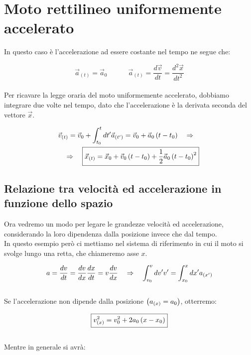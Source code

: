 \section{Moto rettilineo uniformemente accelerato}
In questo caso è l'accelerazione ad essere costante nel tempo
ne segue che:

\begin{equation}
    \vec a_{(t)} = \vec a_0 \quad\quad\quad \vec a_{(t)} = \frac{d\vec v}{dt} = 
    \frac{d^2\vec x}{dt^2}
\label{eq:acceleration}
\end{equation}
\\
Per ricavare la legge oraria del moto uniformemente accelerato,
dobbiamo integrare due volte nel tempo, dato che l'accelerazione
è la derivata seconda del vettore $\vec x$.

\begin{multline}
    \vec v_{(t)} = \vec v_0 + \int_{t_0}^{t}dt' \vec a_{(t')} =  \vec v_0 +  \vec a_0\left( t - t_0\right)\quad\Rightarrow\quad
    \\\quad\Rightarrow\quad\boxed{\vec x_{(t)} = \vec x_0 +\vec v_0\left( t - t_0\right) + \frac12\vec a_0\left( t-t_0\right)^2}
\label{eq:MRUA}
\end{multline}

\subsection{Relazione tra velocità ed accelerazione in funzione dello spazio}
Ora vedremo un modo per legare le grandezze velocità ed 
accelerazione, considerando la loro dipendenza dalla posizione
invece che dal tempo.\\
In questo esempio però ci mettiamo nel sistema di riferimento 
in cui il moto si svolge lungo una retta, che chiameremo asse $x$.

\begin{equation}
    a = \frac{dv}{dt} = \frac{dv}{dx}\frac{dx}{dt} =
    v\frac{dv}{dx}\quad\Rightarrow\quad \int_{v_0}^{v}dv'v' = \int_{x_0}^{x}dx'a_{(x')}
\end{equation}
\\
Se l'accelerazione non dipende dalla posizione $\left( a_{(x)} = a_0\right)$, otterremo:

\begin{equation}
    \boxed{v^2_{(x)} = v_0^2 + 2a_0\left( x-x_0\right)}
\label{eq:v(x)_0}
\end{equation}
\\
Mentre in generale si avrà:


